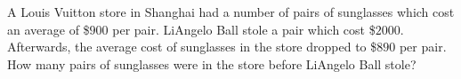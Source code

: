 A Louis Vuitton store in Shanghai had a number of pairs of sunglasses which cost an average of \$$900$ per pair. LiAngelo Ball stole a pair which cost \$$2000$. Afterwards, the average cost of sunglasses in the store dropped to \$$890$ per pair. How many pairs of sunglasses were in the store before LiAngelo Ball stole?